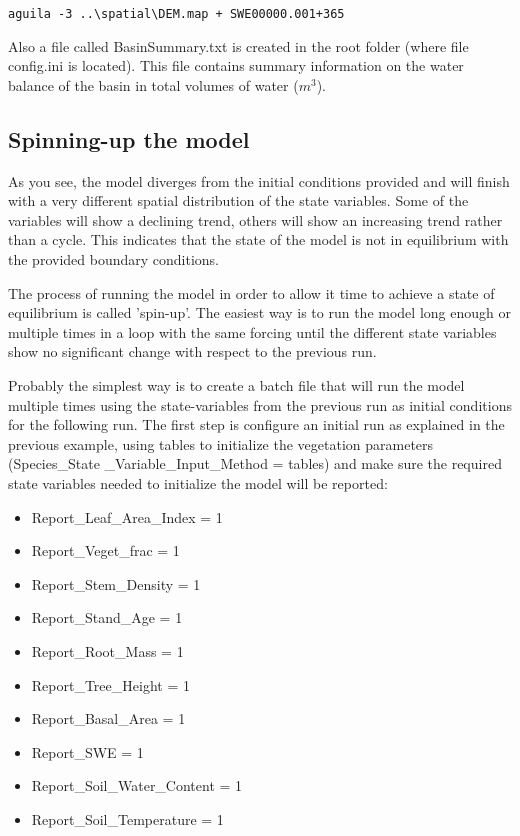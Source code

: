 \begin{verbatim}
aguila -3 ..\spatial\DEM.map + SWE00000.001+365
\end{verbatim}

Also a file called \textsf{BasinSummary.txt} is created in the root folder (where file \textsf{config.ini} is located). This file contains summary information on the water balance of the basin in total volumes of water ($m^{3}$).
 

\subsection{Spinning-up the model}

As you see, the model diverges from the initial conditions provided and will finish with a very different spatial distribution of the state variables. Some of the variables will show a declining trend, others will show an increasing trend rather than a cycle. This indicates that the state of the model is not in equilibrium with the provided boundary conditions.

The process of running the model in order to allow it time to achieve a state of equilibrium is called 'spin-up'. The easiest way is to run the model long enough or multiple times in a loop with the same forcing until the different state variables show no significant change with respect to the previous run.


Probably the simplest way is to create a batch file that will run the model multiple times using the state-variables from the previous run as initial conditions for the following run. The first step is configure an initial run as explained in the previous example, using tables to initialize the vegetation parameters (\textsf{Species\_State \_Variable\_Input\_Method = tables}) and make sure the required state variables needed to initialize the model will be reported:
 
\begin{itemize}

\item Report\_Leaf\_Area\_Index = 1
\item Report\_Veget\_frac = 1
\item Report\_Stem\_Density = 1
\item Report\_Stand\_Age = 1
\item Report\_Root\_Mass = 1
\item Report\_Tree\_Height = 1
\item Report\_Basal\_Area = 1
\item Report\_SWE = 1
\item Report\_Soil\_Water\_Content = 1 
\item Report\_Soil\_Temperature = 1

\end{itemize}

